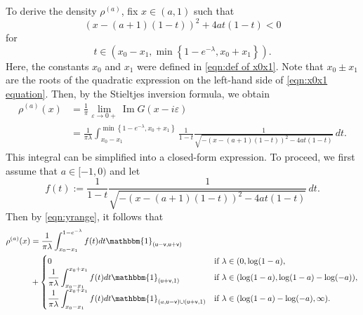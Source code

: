 \documentclass{amsart}
\newcommand{\im}{\operatorname{Im}}
\newcommand{\set}[1]{\left\{#1\right\}}
\theoremstyle{plain}
\theoremstyle{remark}
\numberwithin{equation}{section}
\begin{document}
To derive the density \( \rho^{(a)} \), fix \( x \in (a, 1) \) such that
\begin{equation}\label{eqn:x0x1 equation}
    (x-(a+1)(1-t))^{2}+4at(1-t)<0
\end{equation}
for
\begin{equation*}
    t\in(x_{0}-x_{1},\min\set{1-e^{-\lambda}, x_{0}+x_{1}}).
\end{equation*}  
Here, the constants $x_0$ and $x_1$ were defined in \eqref{eqn:def of x0x1}. Note that \( x_0 \pm x_1 \) are the roots of the quadratic expression on the left-hand side of \eqref{eqn:x0x1 equation}. Then, by the Stieltjes inversion formula, we obtain
\begin{equation}\label{eqn:integral rep of density}
\begin{split}
    {\rho}^{(a)}(x)
    &=\frac{1}{\pi}\lim_{\varepsilon\rightarrow0+} \im G(x-i\varepsilon)\\
    &=\frac{1}{\pi{\lambda}}\int_{x_{0}-x_{1}}^{\min\set{1-e^{-\lambda},x_{0}+x_{1}}}\frac{1}{1-t}\frac{1}{\sqrt{-(x-(a+1)(1-t))^2-4at(1-t)}} \, dt. 
\end{split}
\end{equation}
This integral can be simplified into a closed-form expression. To proceed, we first assume that $a\in[-1,0)$ and let
\begin{equation*}
    f(t):=\frac{1}{1-t}\frac{1}{\sqrt{-(x-(a+1)(1-t))^2-4at(1-t)}}\, dt. 
\end{equation*}
Then by \eqref{eqn:yrange}, it follows that
\begin{equation}\label{eqn:density}
    \begin{split}
        \rho^{(a)}(x)
        &=\frac{1}{\pi\lambda}\int_{x_{0}-x_{1}}^{1-e^{-\lambda}}f(t)dt\mathbbm{1}_{(\mathsf u- \mathsf v,\mathsf{u}+\mathsf{v})}\\
        &+\begin{cases}
            0 & \textup{if }\lambda \in (0, \log(1-a), \\
            \displaystyle\frac{1}{\pi\lambda} \int_{x_{0}-x_{1}}^{x_{0}+x_{1}}f(t)dt\mathbbm{1}_{(\mathsf u+ \mathsf v,1)} & \textup{if }\lambda \in ( \log(1-a), \log(1-a)-\log(-a)), \\
            \displaystyle\frac{1}{\pi\lambda}\int_{x_{0}-x_{1}}^{x_0+x_1}f(t)dt\mathbbm{1}_{(a,\mathsf u-\mathsf v)\cup(\mathsf u+ \mathsf v,1)} & \textup{if }\lambda \in ( \log(1-a)-\log(-a),\infty). 
        \end{cases}
    \end{split}
\end{equation} 
\end{document}
